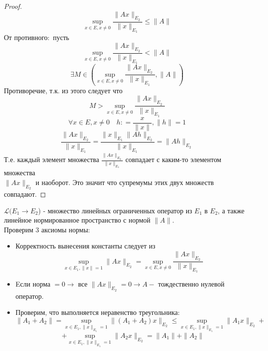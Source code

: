 \begin{proof}
    \[
        \sup_{x \in E, x \neq 0} \frac{\| A x \|_{E_2}}{\| x \|_{E_1}}  \leq \| A \|
    \]
    От противного$\colon$ пусть 
    \[
        \sup_{x \in E, x \neq 0} \frac{\| A x \|_{E_2}}{\| x \|_{E_1}}  < \| A \|
    \]
    \[
        \exists M \in (\sup_{x \in E, x \neq 0} \frac{\| A x \|_{E_2}}{\| x \|_{E_1}}, \| A \|)
    \]
    Противоречие, т.к. из этого следует что 
    \[
        M > \sup_{x \in E, x \neq 0} \frac{\| A x \|_{E_2}}{\| x \|_{E_1}}
    \]
    \[
        \forall x \in E, x \neq 0\quad h\colon= \frac{x}{\| x \|}, \| h \| = 1
    \]
    \[
        \frac{\| A x \|_{E_2}}{\| x \|_{E_1}} = \frac{\| x \|_{E_1} \| A h \|_{E_2}}{\| x \|_{E_1}} = \| A h \|_{E_2}
    \]
    Т.е. каждый элемент множества $\frac{\| A x \|_{E_2}}{\| x \|_{E_1}} $  совпадает с каким-то элементом множества \\ $\| A x \|_{E_2}$ и наоборот. Это значит что супремумы этих двух множеств совпадают.
\end{proof}

\begin{note}
    $\mathcal{L} (E_1 \to E_2$) - множество линейных ограниченных оператор из $E_1$ в $E_2$, а также линейное нормированное пространство с нормой $\| A \|$. \\
    Проверим 3 аксиомы нормы$\colon$
    \begin{itemize}
        \item Корректность вынесения константы следует из 
        \[
            \sup_{x \in E_1, \| x \| = 1} \| A x \|_{E_2} = \sup_{x \in E, x \neq 0} \frac{\| A x \|_{E_2}}{\| x \|_{E_1}}
        \]
        \item Eсли норма $=0 \to$ все $\| A x \|_{E_2} = 0 \to A - $ тождественно нулевой оператор.
        \item Проверим, что выполняется неравенство треугольника$\colon$
        \[  
            \| A_1 + A_2 \| = \sup_{x \in E_1, \| x \|_{E_1} = 1} \| (A_1 + A_2) x \|_{E_2} \leq \sup_{x \in E_1, \| x \|_{E_1} = 1} \| A_1 x \|_{E_2} +
        \]
        \[
            + \sup_{x \in E_1, \| x \|_{E_1} = 1} \| A_2 x \|_{E_2} = \| A_1 \| + \| A_2 \|
        \]
    \end{itemize}
\end{note}